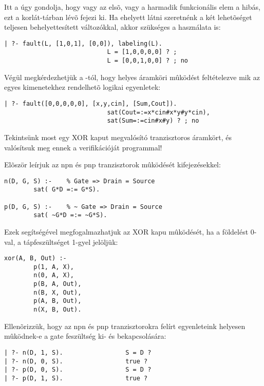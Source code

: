 Itt a  úgy gondolja, hogy vagy az elsõ, vagy a harmadik funkcionális
elem a hibás, ezt a korlát-tárban lévõ  fejezi ki. Ha
ehelyett látni szeretnénk a két lehetõséget teljesen behelyettesített
változókkal, akkor szükséges a  használata is:

\begin{verbatim}
| ?- fault(L, [1,0,1], [0,0]), labeling(L).
                            L = [1,0,0,0,0] ? ;
                            L = [0,0,1,0,0] ? ; no
\end{verbatim}

Végül megkérdezhetjük a -tól, hogy helyes áramköri mûködést
feltételezve mik az egyes kimenetekhez rendelhetõ logikai egyenletek:

\begin{verbatim}
| ?- fault([0,0,0,0,0], [x,y,cin], [Sum,Cout]).
                            sat(Cout=:=x*cin#x*y#y*cin),
                            sat(Sum=:=cin#x#y) ? ; no
\end{verbatim}

Tekintsünk most egy XOR kaput megvalósító tranzisztoros áramkört, és
valósítsuk meg ennek a verifikációját \clpb programmal!

\begin{center}\end{center}

Elõször leírjuk az npn és pnp tranzisztorok mûködését \clpb kifejezésekkel:
\begin{verbatim}
n(D, G, S) :-    % Gate => Drain = Source
        sat( G*D =:= G*S).

p(D, G, S) :-    % ~ Gate => Drain = Source
        sat( ~G*D =:= ~G*S).
\end{verbatim}

Ezek segítségével megfogalmazhatjuk az XOR kapu mûködését, ha a földelést
0-val, a tápfeszültséget 1-gyel jelöljük:

\begin{verbatim}
xor(A, B, Out) :-
        p(1, A, X),
        n(0, A, X),
        p(B, A, Out),
        n(B, X, Out),
        p(A, B, Out),
        n(X, B, Out).
\end{verbatim}

Ellenõrizzük, hogy az npn és pnp tranzisztorokra felírt egyenleteink
helyesen mûködnek-e a gate feszültség ki- és bekapcsolására:

\begin{verbatim}
| ?- n(D, 1, S).                 S = D ?
| ?- n(D, 0, S).                 true ?
| ?- p(D, 0, S).                 S = D ?
| ?- p(D, 1, S).                 true ?
\end{verbatim}

